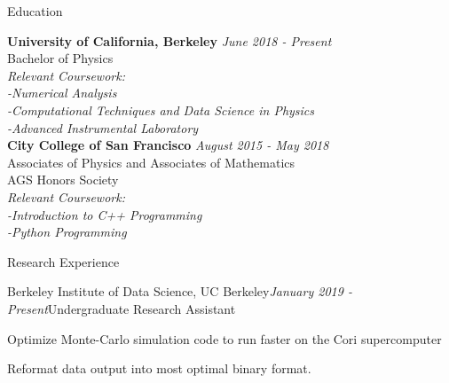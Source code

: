 \documentclass{resume} %
\begin{document}

\begin{rSection}{Education}

{\bf University of California, Berkeley} \hfill {\em June 2018 - Present} 
\\ Bachelor of Physics\\
   {\it Relevant Coursework: \\
   -Numerical Analysis \\
   -Computational Techniques and Data Science in Physics \\
   -Advanced Instrumental Laboratory}\\
{\bf City College of San Francisco} \hfill {\em August 2015 - May 2018} 
\\ Associates of Physics and Associates of Mathematics\hfill
\\ AGS Honors Society
\\ {\it Relevant Coursework: \\
   -Introduction to C++ Programming \\
   -Python Programming }\\
   
\end{rSection}


\begin{rSection}{Research Experience}

\begin{rSubsection}{Berkeley Institute of Data Science, UC Berkeley}{\em January 2019 - Present}{Undergraduate Research Assistant}{}
\item Optimize Monte-Carlo simulation code to run faster on the Cori supercomputer
\item Reformat data output into most optimal binary format. 
\end{rSubsection}

\end{rSection}

\end{document}

